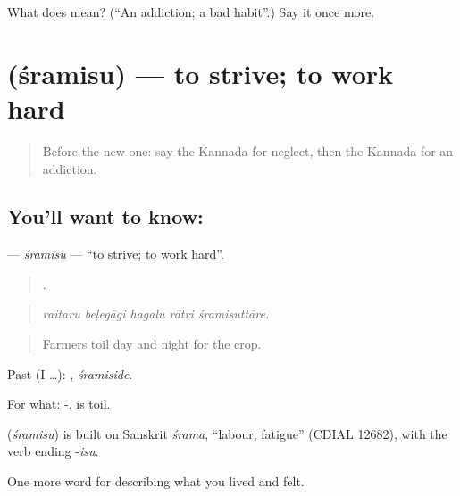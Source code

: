 \begin{tcolorbox}[breakable,colback=teal!4,colframe=teal!35!black,title={Before you move on}]
What does  mean? (\textquotedblleft{}An addiction; a bad habit\textquotedblright{}.) Say it once more.
\end{tcolorbox}
\section[\texorpdfstring{\kn{ಶ್ರಮಿಸು} (śramisu)}{ಶ್ರಮಿಸು (śramisu)}]{ (śramisu) — to strive; to work hard}

\label{lesson:KA-C505-sramisu}



\begin{quote}
Before the new one: say the Kannada for neglect, then the Kannada for an addiction.
\end{quote}

\subsection*{You'll want to know: }
\textbf{} — \emph{śramisu} — \textquotedblleft{}to strive; to work hard\textquotedblright{}.

\begin{quote}
    .
\end{quote}

\begin{quote}
\emph{raitaru beḷegāgi hagalu rātri śramisuttāre.}
\end{quote}

\begin{quote}
Farmers toil day and night for the crop.
\end{quote}

Past (I …): , \emph{śramiside}.

For what: -.  is toil.

\begin{cousinweb}
\textbf{} (\emph{śramisu}) is built on Sanskrit \emph{śrama}, \textquotedblleft{}labour, fatigue\textquotedblright{} (CDIAL 12682), with the verb ending -\emph{isu}.
\end{cousinweb}

\begin{grammarlens}[title={What you've built}]
One more word for describing what you lived and felt.
\end{grammarlens}

